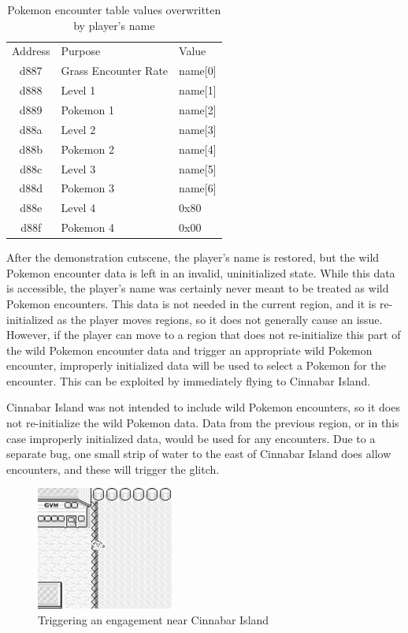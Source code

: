 \documentclass[letterpaper]{article}
\begin{document}
\begin{table}[h!]
\centering
\begin{tabular}{cll}
Address &              Purpose &   Value \\
   d887 & Grass Encounter Rate & name[0] \\
   d888 &              Level 1 & name[1] \\
   d889 &            Pokemon 1 & name[2] \\
   d88a &              Level 2 & name[3] \\
   d88b &            Pokemon 2 & name[4] \\
   d88c &              Level 3 & name[5] \\
   d88d &            Pokemon 3 & name[6] \\
   d88e &              Level 4 &    0x80 \\
   d88f &            Pokemon 4 &    0x00 \\
\end{tabular}
\caption{Pokemon encounter table values overwritten by player's name}
\end{table}

After the demonstration cutscene, the player's name is restored, but the wild Pokemon encounter data is left in an invalid, uninitialized state. While this data is accessible, the player's name was certainly never meant to be treated as wild Pokemon encounters. This data is not needed in the current region, and it is re-initialized as the player moves regions, so it does not generally cause an issue. However, if the player can move to a region that does not re-initialize this part of the wild Pokemon encounter data and trigger an appropriate wild Pokemon encounter, improperly initialized data will be used to select a Pokemon for the encounter. This can be exploited by immediately flying to Cinnabar Island.

Cinnabar Island was not intended to include wild Pokemon encounters, so it does not re-initialize the wild Pokemon data. Data from the previous region, or in this case improperly initialized data, would be used for any encounters. Due to a separate bug, one small strip of water to the east of Cinnabar Island does allow encounters, and these will trigger the glitch.

\begin{figure}[h!]
    \centering
    \includegraphics[width=0.4\textwidth]{surfing.png}
    \caption{Triggering an engagement near Cinnabar Island}
\end{figure}
\end{document}
